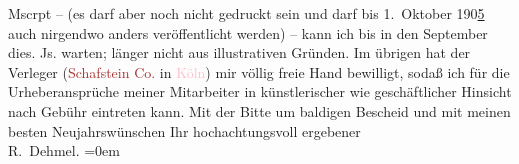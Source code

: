                     Mscrpt – (es darf aber noch nicht gedruckt sein und darf bis 1. Oktober
                            190\uline{5} auch nirgendwo anders veröffentlicht werden) – kann ich bis in den
                        September dies. Js. warten; länger {\pb}nicht aus illustrativen Gründen. Im übrigen hat der Verleger (\textcolor{brown}{Schafstein {\kaufmannsund} Co.}{} in \textcolor{pink}{Köln}{}\ledrightnote{\textcolor{pink}{Köln}}) mir völlig freie Hand bewilligt, sodaß
                    ich für die Urheberansprüche meiner Mitarbeiter in künstlerischer wie
                    geschäftlicher Hinsicht nach Gebühr eintreten kann.\pend
           \pstart
           Mit der Bitte um baldigen Bescheid und mit meinen besten Neujahrswünschen\pend
           \pstart
           Ihr hochachtungsvoll ergebener{\\[\baselineskip]}\spacefill\mbox{R. Dehmel.}\pend
           \leftskip=0em{}\endnumbering{}  
      